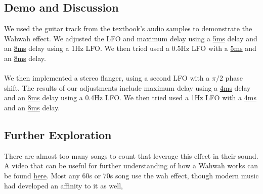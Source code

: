 \subsection{Demo and Discussion}
We used the guitar track from the textbook's audio samples to demonstrate the Wahwah effect. We adjusted the LFO and maximum delay using a
\href{run:../OutputAudio/WahWah_22-004 Original Guitar_{freq=10Hz}{delay_max=5ms}.wav}{5ms}
delay and an
\href{run:../OutputAudio/WahWah_22-004 Original Guitar_{freq=10Hz}{delay_max=8ms}.wav}{8ms}
 delay using a 1Hz LFO. We then tried used a 0.5Hz LFO with a
\href{run:../OutputAudio/WahWah_22-004 Original Guitar_{freq=20Hz}{delay_max=5ms}.wav}{5ms}
and an
\href{run:../OutputAudio/WahWah_22-004 Original Guitar_{freq=20Hz}{delay_max=8ms}.wav}{8ms}
delay.
\\ \\

We then implemented a stereo flanger, using a second LFO with a $\pi /2$ phase shift. The results of our adjustments include maximum delay using a
\href{run:../OutputAudio/stereoflange_22-004 Original Guitar_{freq=0.4Hz}{delay_max=4ms}.wav}{4ms}
delay and an
\href{run:../OutputAudio/stereoflange_22-004 Original Guitar_{freq=0.4Hz}{delay_max=8ms}.wav}{8ms}
 delay using a 0.4Hz LFO. We then tried used a 1Hz LFO with a
\href{run:../OutputAudio/stereoflange_22-004 Original Guitar_{freq=1Hz}{delay_max=4ms}.wav}{4ms}
and an
\href{run:../OutputAudio/stereoflange_22-004 Original Guitar_{freq=1Hz}{delay_max=8ms}.wav}{8ms}
delay.




\subsection{Further Exploration}
There are almost too many songs to count that leverage this effect in their sound. A video that can be useful for further understanding of how a Wahwah works can be found \href{https://www.youtube.com/watch?v=R87mpsSAHXg}{here}. Most any 60s or 70s song use the wah effect, though modern music had developed an affinity to it as well, 
